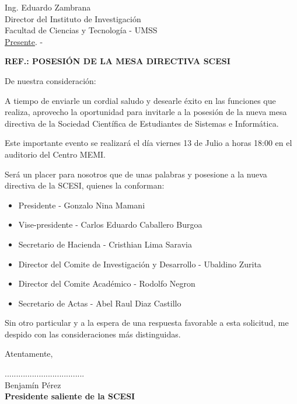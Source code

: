 \documentclass[letterpaper,12pt]{letter}
\begin{document}
\date {12 de julio de 2011}
\begin{letter}{Ing. Eduardo Zambrana \\ Director del Instituto de Investigaci\'on \\ Facultad de Ciencias y Tecnolog\'ia - UMSS \\ \underline {Presente}. -}

\begin{center}
	\opening{\textbf{REF.: POSESI\'ON DE LA MESA DIRECTIVA SCESI}}
\end{center}

De nuestra consideración:

A tiempo de enviarle un cordial saludo y desearle éxito en las funciones que realiza, aprovecho la
oportunidad para invitarle a la posesi\'on de la nueva mesa directiva de la Sociedad Cient\'ifica 
de Estudiantes de Sistemas e Inform\'atica.

Este importante evento se realizar\'a el d\'ia viernes 13 de Julio a horas 18:00 en el auditorio del
Centro MEMI.

Ser\'a un placer para nosotros que de unas palabras y posesione a la nueva directiva de la SCESI,
quienes la conforman:

\begin{itemize}
    \item Presidente - Gonzalo Nina Mamani
    \item Vise-presidente - Carlos Eduardo Caballero Burgoa
    \item Secretario de Hacienda - Cristhian Lima Saravia
    \item Director del Comite de Investigaci\'on y Desarrollo - Ubaldino Zurita
    \item Director del Comite Acad\'emico - Rodolfo Negron
    \item Secretario de Actas - Abel Raul Diaz Castillo
\end{itemize}

Sin otro particular y a la espera de una respuesta favorable a esta solicitud, me despido con las 
consideraciones más distinguidas.

Atentamente,

\vspace{0.3cm}

\begin{center}
...................................\\
Benjam\'in P\'erez\\
{\bfseries Presidente saliente de la  SCESI}
\end{center}
\end{letter}
\end{document}
